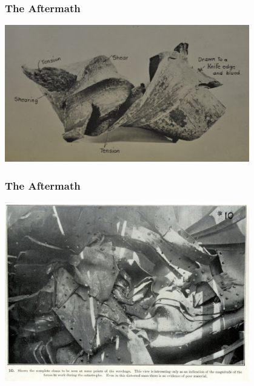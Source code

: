 \begin{frame}
\frametitle{The Aftermath}

\begin{center}
 \includegraphics[width=0.8\textwidth]{images/collapse3}
\end{center}


\end{frame}

\begin{frame}
\frametitle{The Aftermath}

\begin{center}
 \includegraphics[width=0.8\textwidth]{images/collapse4}
\end{center}


\end{frame}

